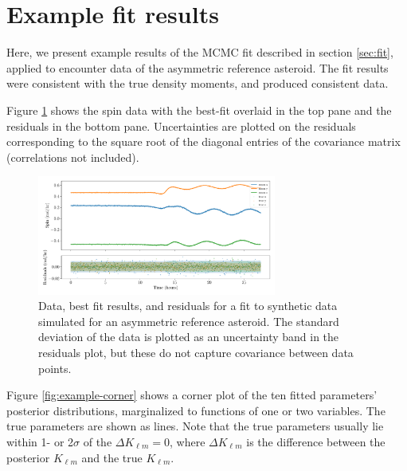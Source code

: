 \documentclass[fleqn,usenatbib]{mnras}
\begin{document}
\section{Example fit results}
\label{app:example}

Here, we present example results of the MCMC fit described in section \ref{sec:fit}, applied to encounter data of the asymmetric reference asteroid. The fit results were consistent with the true density moments, and produced consistent data.

Figure \ref{fig:example-residuals} shows the spin data with the best-fit overlaid in the top pane and the residuals in the bottom pane. Uncertainties are plotted on the residuals corresponding to the square root of the diagonal entries of the covariance matrix (correlations not included).

\begin{figure}
  \centering
  \includegraphics[width=0.7\textwidth]{figs/example-residuals.pdf}
  \caption{Data, best fit results, and residuals for a fit to synthetic data simulated for an asymmetric reference asteroid. The standard deviation of the data is plotted as an uncertainty band in the residuals plot, but these do not capture covariance between data points.}
  \label{fig:example-residuals}
\end{figure}

Figure \ref{fig:example-corner} shows a corner plot of the ten fitted parameters' posterior distributions, marginalized to functions of one or two variables. The true parameters are shown as lines. Note that the true parameters usually lie within 1- or 2$\sigma$ of the $\Delta K_{\ell m} = 0$, where $\Delta K_{\ell m}$ is the difference between the posterior $K_{\ell m}$ and the true $K_{\ell m}$.
\end{document}

